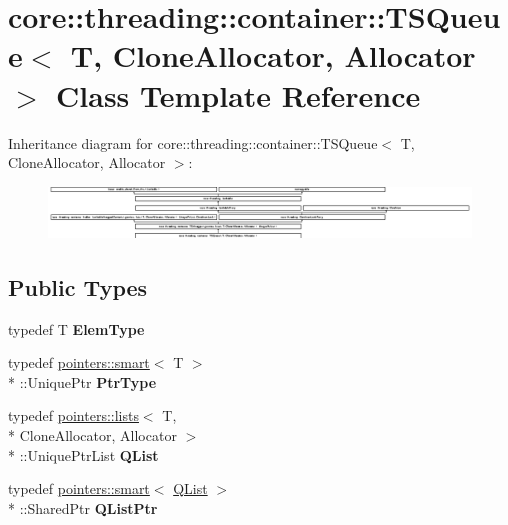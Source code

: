 \hypertarget{classcore_1_1threading_1_1container_1_1_t_s_queue}{\section{core\-:\-:threading\-:\-:container\-:\-:T\-S\-Queue$<$ T, Clone\-Allocator, Allocator $>$ Class Template Reference}
\label{classcore_1_1threading_1_1container_1_1_t_s_queue}
}
Inheritance diagram for core\-:\-:threading\-:\-:container\-:\-:T\-S\-Queue$<$ T, Clone\-Allocator, Allocator $>$\-:\begin{figure}[H]
\begin{center}
\leavevmode
\includegraphics[height=1.377614cm]{classcore_1_1threading_1_1container_1_1_t_s_queue}
\end{center}
\end{figure}
\subsection*{Public Types}
\begin{DoxyCompactItemize}
\item 
\hypertarget{classcore_1_1threading_1_1container_1_1_t_s_queue_a0f9a52bcf88b6ba1d3d97ed0147e6fdd}{typedef T {\bfseries Elem\-Type}}\label{classcore_1_1threading_1_1container_1_1_t_s_queue_a0f9a52bcf88b6ba1d3d97ed0147e6fdd}

\item 
\hypertarget{classcore_1_1threading_1_1container_1_1_t_s_queue_a4161a4d5c4367c2ba9168cce86f69563}{typedef \hyperlink{structcore_1_1pointers_1_1smart}{pointers\-::smart}$<$ T $>$\\*
\-::Unique\-Ptr {\bfseries Ptr\-Type}}\label{classcore_1_1threading_1_1container_1_1_t_s_queue_a4161a4d5c4367c2ba9168cce86f69563}

\item 
\hypertarget{classcore_1_1threading_1_1container_1_1_t_s_queue_aed9108c85cf71cce1e58673ae3941cb0}{typedef \hyperlink{structcore_1_1pointers_1_1lists}{pointers\-::lists}$<$ T, \\*
Clone\-Allocator, Allocator $>$\\*
\-::Unique\-Ptr\-List {\bfseries Q\-List}}\label{classcore_1_1threading_1_1container_1_1_t_s_queue_aed9108c85cf71cce1e58673ae3941cb0}

\item 
\hypertarget{classcore_1_1threading_1_1container_1_1_t_s_queue_a1d11e36eb8458ee9b121e9ddb32e6435}{typedef \hyperlink{structcore_1_1pointers_1_1smart}{pointers\-::smart}$<$ \hyperlink{classcore_1_1container_1_1_unique_ptr_list}{Q\-List} $>$\\*
\-::Shared\-Ptr {\bfseries Q\-List\-Ptr}}\label{classcore_1_1threading_1_1container_1_1_t_s_queue_a1d11e36eb8458ee9b121e9ddb32e6435}

\end{DoxyCompactItemize}

